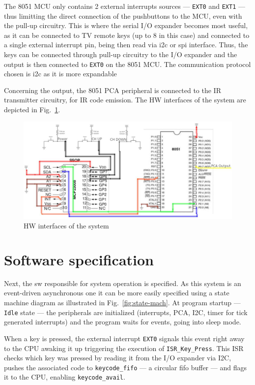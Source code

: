 The 8051 MCU only contains 2 external interrupts sources --- \texttt{EXT0} and
\texttt{EXT1} --- thus limitting the direct connection of the pushbuttons to the
MCU, even with the pull-up circuitry. This is where the serial I/O expander
becomes most useful, as it can be connected to TV remote keys (up to 8 in this
case) and connected to a single external interrupt pin, being then read via
\gls{i2c} or \gls{spi} interface. Thus, the keys can be connected through
pull-up circuitry to the I/O expander and the output is then connected to
\texttt{EXT0} on the 8051 MCU. The communication protocol chosen is \gls{i2c} as
it is more expandable

Concerning the output, the 8051 PCA peripheral is connected to the IR
transmitter circuitry, for IR code emission. The HW interfaces of the system are
depicted in Fig.~\ref{fig:hw-interfaces}.
%
  \vspace{-5mm}
%  
\begin{figure}[htb!]
\centering
    \includegraphics[width=1.0\columnwidth]{./img/hw-interfaces.jpg}
  \caption{HW interfaces of the system}%
\label{fig:hw-interfaces}
\end{figure}
%
%
  \vspace{-5mm}
%  
\section{Software specification}
\label{sec:sw-specs}
Next, the \gls{sw} responsible for system operation is specified. As this system
is an event-driven asynchronous one it can be more easily specified using a
state machine diagram as illustrated in Fig.~\ref{fig:state-mach}. At program
startup --- \texttt{Idle} state --- the peripherals are initialized (interrupts, PCA, I2C, timer for tick
generated interrupts) and the program waits for events, going into sleep
mode.

When a key is pressed, the external interrupt \texttt{EXT0} signals this
event right away to the CPU awaking it up triggering the execution of
\texttt{ISR\_Key\_Press}. This ISR checks which key was pressed by reading it
from the I/O expander via I2C, pushes the associated code to
\texttt{keycode\_fifo} --- a circular \gls{fifo} buffer --- and flags it to the CPU, enabling \texttt{keycode\_avail}.

